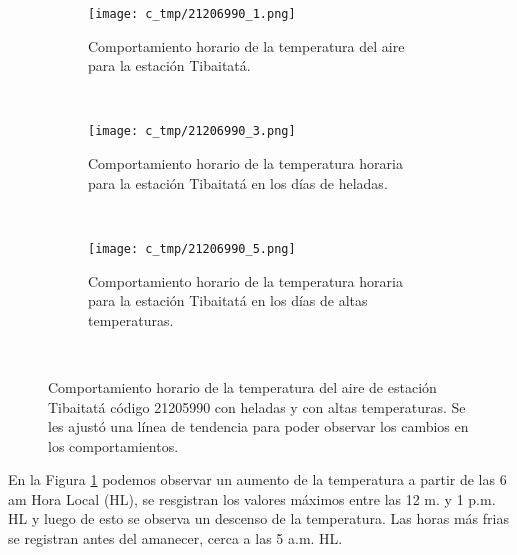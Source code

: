 \begin{figure}[H]
\begin{subfigure}[b]{0.5\textwidth}
\begin{center}
\caption{Comportamiento horario de la temperatura del aire para la estación Tibaitatá.}
\texttt{[image: c\_tmp/21206990\_1.png]}
\label{gra:sin_filtro}
        \end{center}
\end{subfigure}
~
\begin{subfigure}[b]{0.5\textwidth}
\begin{center}
\caption{Comportamiento horario de la temperatura horaria para la estación Tibaitatá en los días de heladas.}
\texttt{[image: c\_tmp/21206990\_3.png]}
\label{gra:helada}
\end{center}    
\end{subfigure}
~
\centering
\begin{subfigure}[b]{0.5\textwidth}
\begin{center}
\caption{Comportamiento horario de la temperatura horaria para la estación Tibaitatá en los días de altas temperaturas.}
\texttt{[image: c\_tmp/21206990\_5.png]}
\label{gra:altas}
\end{center}    
\end{subfigure}
~

\caption{Comportamiento horario de la temperatura del aire de estación Tibaitatá código 21205990 con heladas y con altas temperaturas. Se les ajustó una línea de tendencia para poder observar los cambios en los comportamientos.}
\end{figure}  

En la Figura \ref{gra:sin_filtro} podemos observar un aumento de la temperatura a partir de las 6 am Hora Local (HL), se resgistran los valores máximos entre las 12 m. y 1 p.m. HL y luego de esto se observa un descenso de la temperatura. Las horas más frias se registran antes del amanecer, cerca a las 5 a.m. HL.\\

